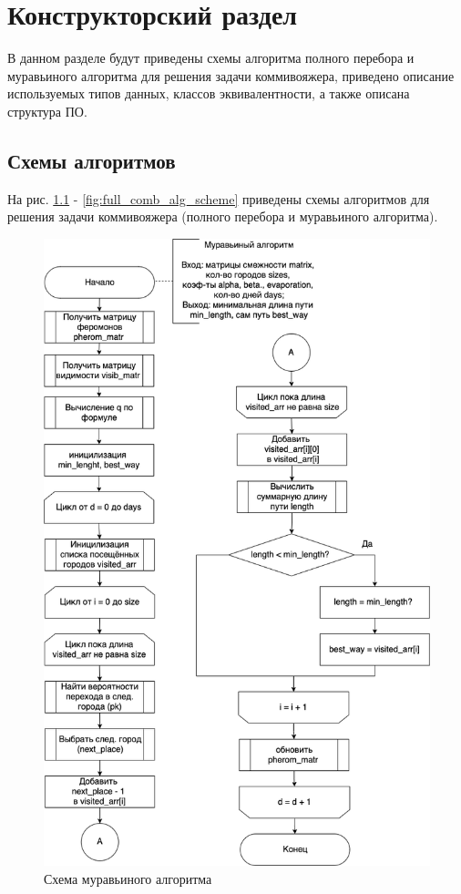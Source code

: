 \chapter{Конструкторский раздел}
\label{cha:design}

В данном разделе будут приведены схемы алгоритма полного перебора и муравьиного алгоритма для решения задачи коммивояжера, приведено описание используемых типов данных, классов эквивалентности, а также описана структура ПО.

\section{Схемы алгоритмов}

На рис. \ref{fig:ant_alg_scheme} - \ref{fig:full_comb_alg_scheme} приведены схемы алгоритмов для решения задачи коммивояжера (полного перебора и муравьиного алгоритма).

\begin{figure}[h]
	\centering
	\includegraphics[scale=0.55]{img/ant_alg_scheme.png}
	\caption{Схема муравьиного алгоритма}
	\label{fig:ant_alg_scheme}
\end{figure}

